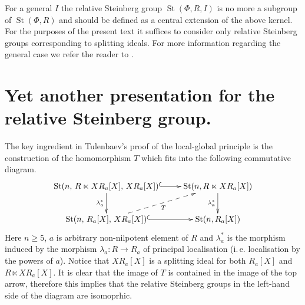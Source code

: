 \documentclass[11pt]{amsart}
\theoremstyle{plain} \declaretheorem[name=Theorem, Refname={Theorem,Theorems}]{tm} \Crefname{tm}{Theorem}{Theorems}
\numberwithin{equation}{section}
\theoremstyle{definition} \newtheorem{df}[lm]{Definition} \Crefname{df}{Definition}{Definitions}
\theoremstyle{remark} \newtheorem{rk}[lm]{Remark} \Crefname{rk}{Remark}{Remarks}
\newcommand{\St}{\mathop{\mathrm{St}}\nolimits}
\begin{document}
For a general $I$ the relative Steinberg group $\St(\Phi, R, I)$ is no more a subgroup of $\St(\Phi, R)$ and should be defined as a central extension of the above kernel.
For the purposes of the present text it suffices to consider only relative Steinberg groups corresponding to splitting ideals.
For more information regarding the general case we refer the reader to \cite[Section~3]{SCh}.

\section{Yet another presentation for the relative Steinberg group.} \label{sec:yap}
The key ingredient in Tulenbaev's proof of the local-global principle is the construction of the homomorphism $T$ which fits into the following commutative diagram.
\begin{equation} \xymatrix{\St(n,\,R\ltimes XR_a[X],\,XR_a[X]) \ar@{^{(}->}[r] \ar[d]_-{\lambda_a^*} & \St(n, R \ltimes XR_a[X]) \ar[d]_-{\lambda_a^*} \\
             \St(n,\,R_a[X],\,XR_a[X]) \ar@{-->}[ru]_-{T} \ar@{^{(}->}[r] & \St(n, R_a[X])} \label{eq:diagram} \end{equation}
Here $n\geq5$, $a$ is arbitrary non-nilpotent element of $R$ and $\lambda_a^*$ is the morphism induced by the morphism $\lambda_a\colon R \to R_a$ of principal localisation (i.\,e. localisation by the powers of $a$).
Notice that $XR_a[X]$ is a splitting ideal for both $R_a[X]$ and $R \ltimes XR_a[X]$.
It is clear that the image of $T$ is contained in the image of the top arrow, therefore this implies that the relative Steinberg groups in the left-hand side of the diagram are isomoprhic.

\end{document}
